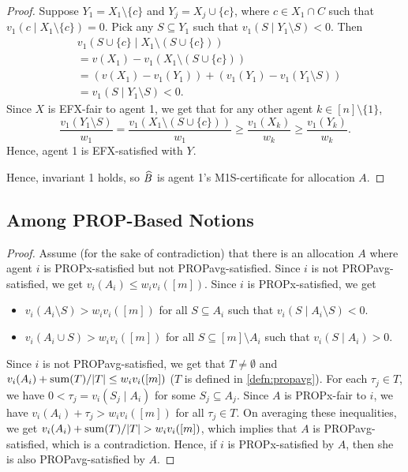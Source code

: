 \begin{proof}
Suppose $Y_1 = X_1 \setminus \{c\}$ and $Y_j = X_j \cup \{c\}$,
where $c \in X_1 \cap C$ such that $v_1(c \mid X_1 \setminus \{c\}) = 0$.
Pick any $S \subseteq Y_1$ such that $v_1(S \mid Y_1 \setminus S) < 0$. Then
\begin{align*}
& v_1(S \cup \{c\} \mid X_1 \setminus (S \cup \{c\}))
\\ &= v(X_1) - v_1(X_1 \setminus (S \cup \{c\}))
\\ &= (v(X_1) - v_1(Y_1)) + (v_1(Y_1) - v_1(Y_1 \setminus S))
\\ &= v_1(S \mid Y_1 \setminus S) < 0.
\end{align*}
Since $X$ is EFX-fair to agent 1, we get that
for any other agent $k \in [n] \setminus \{1\}$,
\[ \frac{v_1(Y_1 \setminus S)}{w_1} = \frac{v_1(X_1 \setminus (S \cup \{c\}))}{w_1}
    \ge \frac{v_1(X_k)}{w_k} \ge \frac{v_1(Y_k)}{w_k}. \]
Hence, agent 1 is EFX-satisfied with $Y$.

Hence, invariant 1 holds, so $\widehat{B}$ is agent 1's M1S-certificate for allocation $A$.
\end{proof}

\subsection{Among PROP-Based Notions}
\label{sec:impls-extra:among-prop-based}

\begin{proof}
Assume (for the sake of contradiction) that there is an allocation $A$ where
agent $i$ is PROPx-satisfied but not PROPavg-satisfied.
%
Since $i$ is not PROPavg-satisfied, we get $v_i(A_i) \le w_iv_i([m])$.
Since $i$ is PROPx-satisfied, we get

\begin{itemize}
\item $v_i(A_i \setminus S) > w_iv_i([m])$ for all $S \subseteq A_i$ such that
    $v_i(S \mid A_i \setminus S) < 0$.
\item $v_i(A_i \cup S) > w_iv_i([m])$ for all $S \subseteq [m] \setminus A_i$
    such that $v_i(S \mid A_i) > 0$.
\end{itemize}

Since $i$ is not PROPavg-satisfied, we get that $T \neq \emptyset$
and $v_i(A_i) + \operatorname{sum}(T)/|T| \le w_iv_i([m])$ ($T$ is defined in \cref{defn:propavg}).
For each $\tau_j \in T$, we have $0 < \tau_j = v_i(S_j \mid A_i)$ for some $S_j \subseteq A_j$.
Since $A$ is PROPx-fair to $i$, we have $v_i(A_i) + \tau_j > w_iv_i([m])$ for all $\tau_j \in T$.
On averaging these inequalities, we get $v_i(A_i) + \operatorname{sum}(T)/|T| > w_iv_i([m])$,
which implies that $A$ is PROPavg-satisfied, which is a contradiction.
Hence, if $i$ is PROPx-satisfied by $A$, then she is also PROPavg-satisfied by $A$.
\end{proof}

